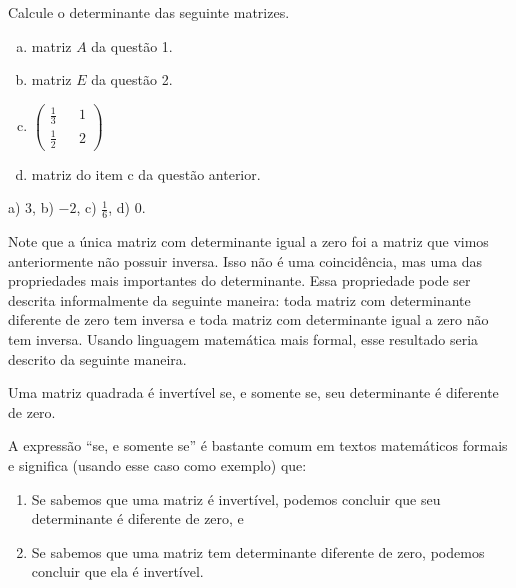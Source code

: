 \documentclass[main.tex]{subfiles}
\begin{document}
\begin{questao}
Calcule o determinante das seguinte matrizes.
\begin{enumerate}[a)]
\item matriz $A$ da questão 1.
\item matriz $E$ da questão 2.
\item $\begin{pmatrix} \frac{1}{3} && 1 \\ \frac{1}{2} && 2 \end{pmatrix}$
\item matriz do item c da questão anterior.
\end{enumerate}
\end{questao}

\begin{gabarito}
	\begin{gabaritoQuestao}
		a) $3$, b) $-2$, c) $\frac{1}{6}$, d) $0$.
	\end{gabaritoQuestao}
\end{gabarito}

Note que a única matriz com determinante igual a zero foi a matriz que vimos anteriormente não possuir inversa. Isso não é uma coincidência, mas uma das propriedades mais importantes do determinante. Essa propriedade pode ser descrita informalmente da seguinte maneira: toda matriz com determinante diferente de zero tem inversa e toda matriz com determinante igual a zero não tem inversa. Usando linguagem matemática mais formal, esse resultado seria descrito da seguinte maneira.

\begin{teorema}
 Uma matriz quadrada é invertível se, e somente se, seu determinante é diferente de zero.
\end{teorema}

A expressão ``se, e somente se'' é bastante comum em textos matemáticos formais e significa (usando esse caso como exemplo) que:

\begin{enumerate}
 \item Se sabemos que uma matriz é invertível, podemos concluir que seu determinante é diferente de zero, e
 \item Se sabemos que uma matriz tem determinante diferente de zero, podemos concluir que ela é invertível.
\end{enumerate}
\end{document}
